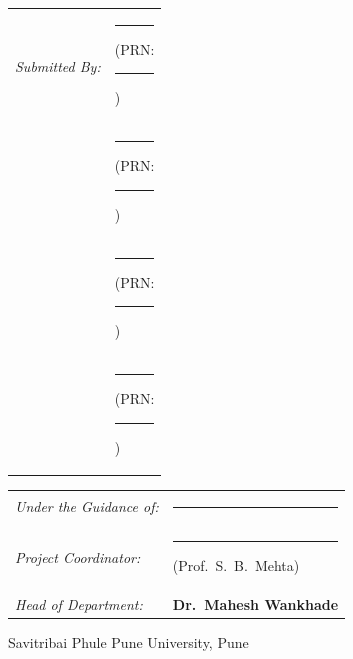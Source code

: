 \documentclass[12pt,a4paper,oneside]{report}
\newcommand{\blankline}[1][3cm]{\rule{#1}{0.4pt}}
\begin{document}
\begin{titlepage}
\begin{tabular}{l l}
\textit{Submitted By:} & \blankline[6cm] \quad (PRN: \blankline[4cm])\\
                       & \blankline[6cm] \quad (PRN: \blankline[4cm])\\
                       & \blankline[6cm] \quad (PRN: \blankline[4cm])\\
                       & \blankline[6cm] \quad (PRN: \blankline[4cm])\\
\end{tabular}

\vspace{0.5cm}
\begin{tabular}{l l}
\textit{Under the Guidance of:} & \blankline[6cm]\\
\textit{Project Coordinator:}    & \blankline[6cm] \quad (Prof.\ S.\ B.\ Mehta)\\
\textit{Head of Department:}     & \textbf{Dr.\ Mahesh Wankhade}\\
\end{tabular}

\vfill
{\small Savitribai Phule Pune University, Pune}\par
\vspace{0.2cm}
\end{titlepage}

\end{document}
